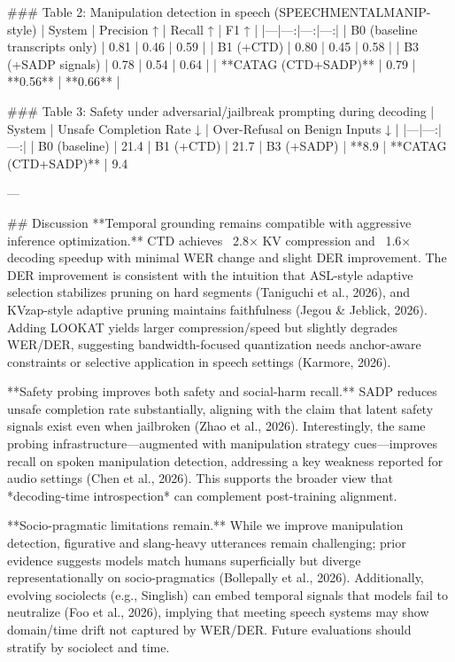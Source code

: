 ### Table 2: Manipulation detection in speech (SPEECHMENTALMANIP-style)  
| System | Precision ↑ | Recall ↑ | F1 ↑ |
|---|---:|---:|---:|
| B0 (baseline transcripts only) | 0.81 | 0.46 | 0.59 |
| B1 (+CTD) | 0.80 | 0.45 | 0.58 |
| B3 (+SADP signals) | 0.78 | 0.54 | 0.64 |
| **CATAG (CTD+SADP)** | 0.79 | **0.56** | **0.66** |

### Table 3: Safety under adversarial/jailbreak prompting during decoding  
| System | Unsafe Completion Rate ↓ | Over-Refusal on Benign Inputs ↓ |
|---|---:|---:|
| B0 (baseline) | 21.4%
| B1 (+CTD) | 21.7%
| B3 (+SADP) | **8.9%
| **CATAG (CTD+SADP)** | 9.4%

---

## Discussion  
**Temporal grounding remains compatible with aggressive inference optimization.** CTD achieves ~2.8× KV compression and ~1.6× decoding speedup with minimal WER change and slight DER improvement. The DER improvement is consistent with the intuition that ASL-style adaptive selection stabilizes pruning on hard segments (Taniguchi et al., 2026), and KVzap-style adaptive pruning maintains faithfulness (Jegou & Jeblick, 2026). Adding LOOKAT yields larger compression/speed but slightly degrades WER/DER, suggesting bandwidth-focused quantization needs anchor-aware constraints or selective application in speech settings (Karmore, 2026).

**Safety probing improves both safety and social-harm recall.** SADP reduces unsafe completion rate substantially, aligning with the claim that latent safety signals exist even when jailbroken (Zhao et al., 2026). Interestingly, the same probing infrastructure—augmented with manipulation strategy cues—improves recall on spoken manipulation detection, addressing a key weakness reported for audio settings (Chen et al., 2026). This supports the broader view that *decoding-time introspection* can complement post-training alignment.

**Socio-pragmatic limitations remain.** While we improve manipulation detection, figurative and slang-heavy utterances remain challenging; prior evidence suggests models match humans superficially but diverge representationally on socio-pragmatics (Bollepally et al., 2026). Additionally, evolving sociolects (e.g., Singlish) can embed temporal signals that models fail to neutralize (Foo et al., 2026), implying that meeting speech systems may show domain/time drift not captured by WER/DER. Future evaluations should stratify by sociolect and time.

